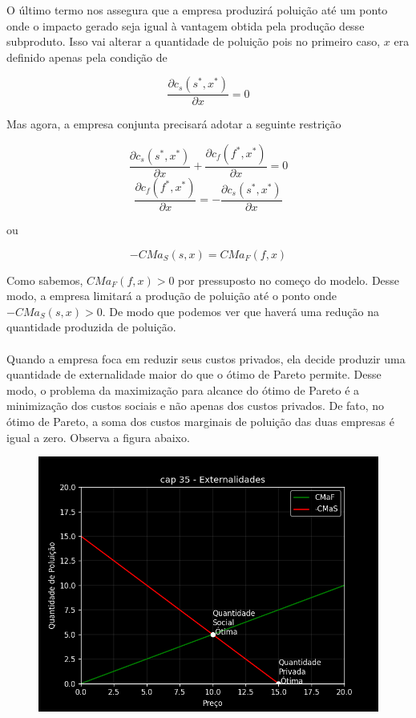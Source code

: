 \documentclass[a4paper,11pt,oneside]{book}
\theoremstyle{definition}
\theoremstyle{break}
\begin{document}
O último termo nos assegura que a empresa produzirá poluição até um ponto onde o impacto gerado seja igual à vantagem obtida pela produção desse subproduto. Isso vai alterar a quantidade de poluição pois no primeiro caso, $x$ era definido apenas pela condição de 

$$ \frac{\partial c_s(s^*,x^*)}{\partial x} = 0 $$

Mas agora, a empresa conjunta precisará adotar a seguinte restrição

$$ \frac{\partial c_s(s^*,x^*)}{\partial x} + \frac{\partial c_f(f^*,x^*)}{\partial x}= 0 $$
$$\frac{\partial c_f(f^*,x^*)}{\partial x} = - \frac{\partial c_s(s^*,x^*)}{\partial x} $$

\begin{center}
	ou
\end{center}

$$ - CMa_S(s,x) = CMa_F(f,x) $$

Como sabemos, $CMa_F(f,x) > 0$ por pressuposto no começo do modelo. Desse modo, a empresa limitará a produção de poluição até o ponto onde $- CMa_S(s,x) > 0$. De modo que podemos ver que haverá uma redução na quantidade produzida de poluição.
\\~\\
Quando a empresa foca em reduzir seus custos privados, ela decide produzir uma quantidade de externalidade maior do que o ótimo de Pareto permite. Desse modo, o problema da maximização para alcance do ótimo de Pareto é a minimização dos custos sociais e não apenas dos custos privados. De fato, no ótimo de Pareto, a soma dos custos marginais de poluição das duas empresas é igual a zero. Observa a figura abaixo.

\begin{figure}[H]
	\centering
	\includegraphics[scale=0.7]{cap35_3-producao_externalidade.png}
\end{figure}
\end{document}
